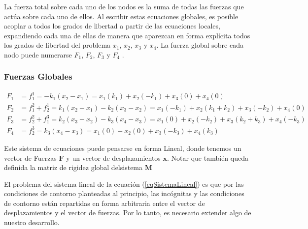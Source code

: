 
La fuerza total sobre cada uno de los nodos es la suma de todas las fuerzas que actúa sobre cada
uno de ellos. Al escribir estas ecuaciones globales, es posible acoplar a todos los grados de
libertad a partir de las ecuaciones locales, expandiendo cada una de ellas de manera que
aparezcan en forma explícita todos los grados de libertad del problema $x_1$, $x_2$, $x_3$ y
$x_4$. La fuerza global sobre cada nodo puede numerarse $F_1$, $F_2$, $F_3$ y $F_4$ .

\mode*

\begin{frame}[label=FrameFuerzasGlobales]
  \frametitle<presentation>{Fuerzas Globales}

  \begin{figure}[h]
  \end{figure}
%
 \tiny 
  \begin{equation}\label{EqSistemaLinealExpandido}
    \begin{aligned}
      F_1 &= f_1^1  = -k_1( x_2-x_1) =
                   x_1 (k_1) + x_2(-k_1)+ x_3(0) + x_4(0)\\
      F_2 &= f_1^2 + f_2^1 = k_1( x_2-x_1) -k_2(x_3 - x_2) = 
                   x_1 (-k_1) + x_2(k_1+k_2)+ x_3(-k_2) + x_4(0)\\
      F_3 &= f_2^2 + f_1^3 = k_2( x_3-x_2) - k_3 (x_4 - x_3) = 
                    x_1 (0) + x_2(-k_2)+ x_3(k_2 + k_3) + x_4(-k_3)\\
      F_4 &= f_2^3 = k_3( x_4-x_3)=
                     x_1 (0) + x_2(0)+ x_3(-k_3) + x_4(k_3)
    \end{aligned}
  \end{equation}
%
\end{frame}


Este sistema de ecuaciones puede pensarse en forma Lineal, donde tenemos un
vector de Fuerzas $\mathbf{F}$  y un vector de desplazamientos $\mathbf{x}$. Notar que también
queda definida la matriz de rigidez global delsistema $\mathbf{M}$

El problema del  sistema lineal de la ecuación (\ref{eqSistemaLineal})
es que por las condiciones de contorno
planteadas al principio, las incógnitas y las condiciones de contorno están
repartidas en forma arbitraria entre el vector de desplazamientos y el vector
de fuerzas. Por lo tanto, es necesario extender algo de nuestro desarrollo.


